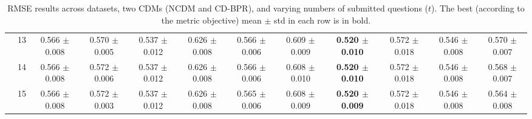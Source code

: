 \begin{table*}[t]
{\begin{tabular}{%
  ll
  @{\quad}
  c@{\hskip 4pt}c
  @{\quad\quad}
  c@{\hskip 4pt}c
  @{\quad\quad}
  c@{\hskip 4pt}c
  @{\quad\quad}
  c@{\hskip 4pt}c
  @{\quad\quad}
  c@{\hskip 4pt}c
}
        & 13 & 0.566 $\pm$ 0.008 & 0.570 $\pm$ 0.005 & 0.537 $\pm$ 0.012 & 0.626 $\pm$ 0.008 & 0.566 $\pm$ 0.006 & 0.609 $\pm$ 0.009 & \textbf{0.520 $\pm$ 0.010} & 0.572 $\pm$ 0.018 & 0.546 $\pm$ 0.008 & 0.570 $\pm$ 0.007 \\
        & 14 & 0.566 $\pm$ 0.008 & 0.572 $\pm$ 0.006 & 0.537 $\pm$ 0.012 & 0.626 $\pm$ 0.008 & 0.566 $\pm$ 0.006 & 0.608 $\pm$ 0.010 & \textbf{0.520 $\pm$ 0.010} & 0.572 $\pm$ 0.018 & 0.546 $\pm$ 0.008 & 0.568 $\pm$ 0.007 \\
        & 15 & 0.566 $\pm$ 0.008 & 0.572 $\pm$ 0.003 & 0.537 $\pm$ 0.012 & 0.626 $\pm$ 0.008 & 0.565 $\pm$ 0.006 & 0.608 $\pm$ 0.009 & \textbf{0.520 $\pm$ 0.009} & 0.572 $\pm$ 0.018 & 0.546 $\pm$ 0.008 & 0.564 $\pm$ 0.008 \\
\bottomrule
\end{tabular}
}
\caption{RMSE results across datasets, two CDMs (NCDM and CD-BPR), and varying numbers of submitted questions ($t$). The best (according to the metric objective) mean $\pm$ std in each row is in bold.}
\label{tab:results-rmse}
\end{table*}


